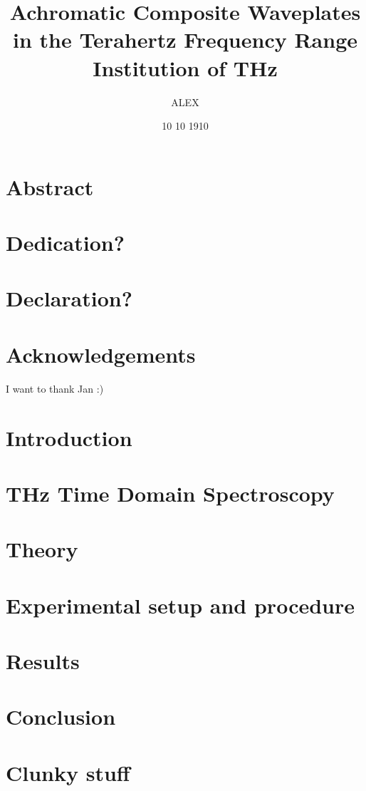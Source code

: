 \documentclass[12pt, a4paper]{report}
\title{
{Achromatic Composite Waveplates in the Terahertz Frequency Range}\\
{\large Institution of THz}\\
}
\author{ALEX}
\date{10 10 1910}
\begin{document}
\maketitle

\chapter*{Abstract}

\chapter*{Dedication?}

\chapter*{Declaration?}

\chapter*{Acknowledgements}
I want to thank Jan :)

\tableofcontents

\listoffigures


\chapter{Introduction}


\chapter{THz Time Domain Spectroscopy}


\chapter{Theory}


\chapter{Experimental setup and procedure}


\chapter{Results}


\chapter{Conclusion}


\appendix
\chapter{Clunky stuff}


\printbibliography

\end{document}
